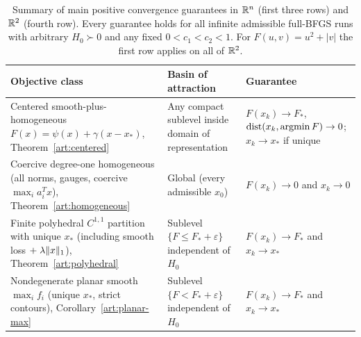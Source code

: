 \begin{table}[tbp]
\centering
\begin{tabular}{@{}>{\raggedright\arraybackslash}p{}>{\raggedright\arraybackslash}p{}>{\raggedright\arraybackslash}p{}@{}}
\toprule
Objective class & Basin of attraction & Guarantee\\
\midrule
Centered smooth-plus-homogeneous $F(x)=\psi(x)+\gamma(x-x_*)$, Theorem~\ref{art:centered}
& Any compact sublevel inside domain of representation
& $F(x_k)\to F_*$, $\operatorname{dist}(x_k,\operatorname{argmin} F)\to0$; $x_k\to x_*$ if unique\\\addlinespace
Coercive degree-one homogeneous (all norms, gauges, coercive $\max_ia_i^Tx$), Theorem~\ref{art:homogeneous}
& Global (every admissible $x_0$)
& $F(x_k)\to0$ and $x_k\to0$\\\addlinespace
Finite polyhedral $C^{1,1}$ partition with unique $x_*$ (including smooth loss $+\;\lambda\lVert x\rVert_1$), Theorem~\ref{art:polyhedral}
& Sublevel $\{F\le F_*+\varepsilon\}$ independent of $H_0$
& $F(x_k)\to F_*$ and $x_k\to x_*$\\\addlinespace
Nondegenerate planar smooth $\max_if_i$ (unique $x_*$, strict contours), Corollary~\ref{art:planar-max}
& Sublevel $\{F<F_*+\varepsilon\}$ independent of $H_0$
& $F(x_k)\to F_*$ and $x_k\to x_*$\\
\bottomrule
\end{tabular}
\caption{Summary of main positive convergence guarantees in $\mathbb R^n$ (first three
rows) and $\mathbb R^2$ (fourth row). Every guarantee holds for all infinite
admissible full-BFGS runs with arbitrary $H_0\succ0$ and any fixed
$0<c_1<c_2<1$. For $F(u,v)=u^2+|v|$ the first row applies on all of $\mathbb R^2$.}
\label{art:positive-outcomes}
\end{table}


